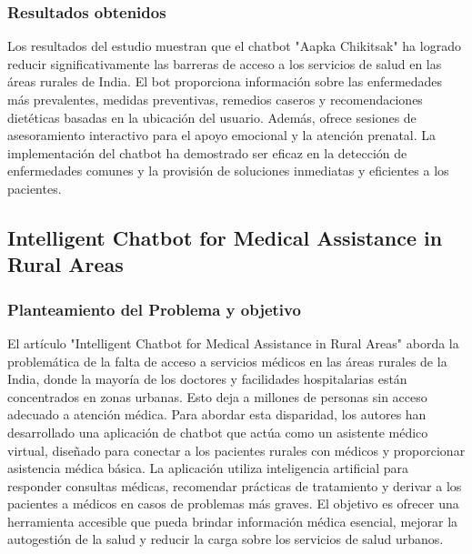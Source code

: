 		\subsubsection{Resultados obtenidos}
Los resultados del estudio muestran que el chatbot "Aapka Chikitsak" ha logrado reducir significativamente las barreras de acceso a los servicios de salud en las áreas rurales de India. El bot proporciona información sobre las enfermedades más prevalentes, medidas preventivas, remedios caseros y recomendaciones dietéticas basadas en la ubicación del usuario. Además, ofrece sesiones de asesoramiento interactivo para el apoyo emocional y la atención prenatal. La implementación del chatbot ha demostrado ser eficaz en la detección de enfermedades comunes y la provisión de soluciones inmediatas y eficientes a los pacientes.

\subsection{Intelligent Chatbot for Medical Assistance in Rural Areas} %

	\subsubsection{Planteamiento del Problema y objetivo}
		El artículo "Intelligent Chatbot for Medical Assistance in Rural Areas" aborda la problemática de la falta de acceso a servicios médicos en las áreas rurales de la India, donde la mayoría de los doctores y facilidades hospitalarias están concentrados en zonas urbanas. Esto deja a millones de personas sin acceso adecuado a atención médica. Para abordar esta disparidad, los autores han desarrollado una aplicación de chatbot que actúa como un asistente médico virtual, diseñado para conectar a los pacientes rurales con médicos y proporcionar asistencia médica básica. La aplicación utiliza inteligencia artificial para responder consultas médicas, recomendar prácticas de tratamiento y derivar a los pacientes a médicos en casos de problemas más graves. El objetivo es ofrecer una herramienta accesible que pueda brindar información médica esencial, mejorar la autogestión de la salud y reducir la carga sobre los servicios de salud urbanos.


